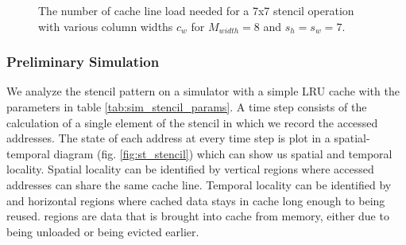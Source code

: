\documentclass{article}
\begin{document}
\begin{figure}
{
}
\qquad
{}
\caption{
    The number of cache line load needed for a 7x7 stencil operation with various column widths $c_w$ for $M_{width} = 8$ and $s_h = s_w = 7$.
}
\label{fig:matrix_loads}
\end{figure}

\subsubsection{Preliminary Simulation}
\label{sec:stencil_sim}
We analyze the stencil pattern on a simulator with a simple LRU cache with the parameters in table \ref{tab:sim_stencil_params}. 
A time step consists of the calculation of a single element of the stencil in which we record the accessed addresses.
The state of each address at every time step is plot in a spatial-temporal diagram (fig. \ref{fig:st_stencil}) which can show us spatial and temporal locality.
Spatial locality can be identified by  vertical regions where accessed addresses can share the same cache line.
Temporal locality can be identified by  and  horizontal regions where cached data stays in cache long enough to being reused.  regions are data that is brought into cache from memory, either due to being unloaded or being evicted earlier.
\end{document}
